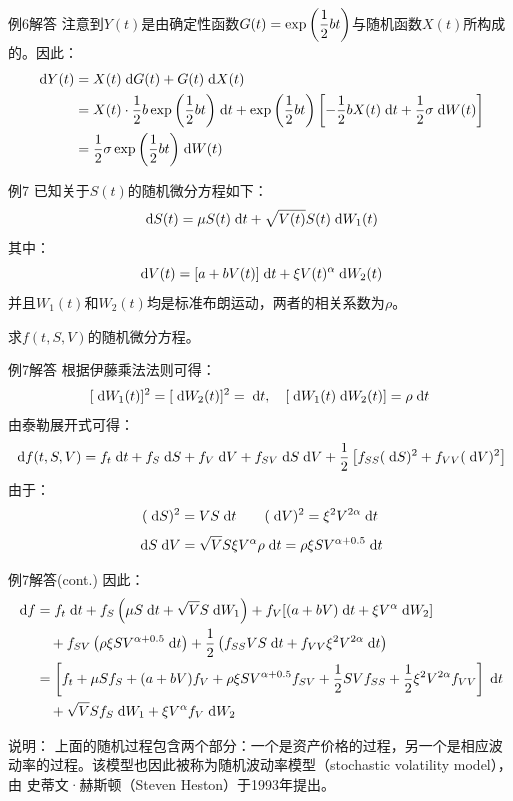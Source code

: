 \documentclass[t]{beamer}
\newcommand{\dif}{{\;\rm d}}
\begin{document}
\begin{frame}{例6解答}
    注意到$Y(t)$是由确定性函数$G(t)=\exp\qty(\displaystyle\frac{1}{2}bt)$与随机函数$X(t)$所构成的。因此：
    \[\begin{split}
    \dif Y(t)&= X(t)\dif G(t)+G(t)\dif X(t)\\
    &=X(t)\cdot \frac{1}{2}b\exp\qty(\displaystyle\frac{1}{2}bt)\dif t+\exp\qty(\displaystyle\frac{1}{2}bt)\left[-\frac{1}{2}bX(t)\dif t+\frac{1}{2}\sigma \dif W(t)\right]\\
    &=\frac{1}{2}\sigma \exp\qty(\displaystyle\frac{1}{2}bt)  \dif W(t)
    \end{split} \]
    
    \end{frame}


\begin{frame}{例7}
已知关于$S(t)$的随机微分方程如下：
\[\dif S(t)=\mu S(t)\dif t +\sqrt{V(t)}S(t)\dif W_1(t) \]
其中：
\[\dif V(t)=[a+b V(t)]\dif t +\xi V(t)^{\alpha}\dif W_2(t) \]
并且$W_1(t)$和$W_2(t)$均是标准布朗运动，两者的相关系数为$\rho$。

求$f(t,S,V)$的随机微分方程。
\end{frame}


    \begin{frame}{例7解答}
        根据伊藤乘法法则可得：$$[\dif W_1(t)]^2=[\dif W_2(t)]^2=\dif t,\quad [\dif W_1(t)\dif W_2(t)]=\rho\dif t$$
        由泰勒展开式可得：
        \[\dif f(t,S,V)=f_t\dif t+f_S\dif S+f_V\dif V+f_{SV}\dif S\dif V+\frac{1}{2}\left[f_{SS}(\dif S)^2+f_{VV}(\dif V)^2\right]\]
        由于：
        \[    (\dif S)^2=VS\dif t\qquad 
        (\dif V)^2=\xi^2 V^{2\alpha}\dif t\]
        \[\dif S\dif V=\sqrt{V}S\xi V^{\alpha}\rho\dif t=\rho\xi SV^{\alpha+0.5}\dif t
    \]
\end{frame}


\begin{frame}{例7解答(cont.)}
        因此：
        \[\begin{split}
        \dif f&=f_t\dif t+f_S\left(\mu S\dif t +\sqrt{V}S\dif W_1\right)+f_V[(a+b V)\dif t +\xi V^{\alpha}\dif W_2]\\
        &\quad +f_{SV}\left(\rho\xi SV^{\alpha+0.5}\dif t\right)+\frac{1}{2}\left(f_{SS}VS\dif t+f_{VV}\xi^2 V^{2\alpha}\dif t\right)\\
        &=\left[f_t+\mu S f_S+(a+bV)f_V+\rho\xi SV^{\alpha+0.5}f_{SV}+\frac{1}{2}SVf_{SS}+\frac{1}{2}\xi^2 V^{2\alpha}f_{VV} \right]\dif t \\
        &\quad +\sqrt{V}Sf_S \dif W_1+\xi V^{\alpha}f_V\dif W_2
        \end{split} \]

        \begin{block}{说明：}
            上面的随机过程包含两个部分：一个是资产价格的过程，另一个是相应波
动率的过程。该模型也因此被称为随机波动率模型（stochastic volatility model），由
史蒂文·赫斯顿（Steven Heston）于1993年提出。
        \end{block}
\end{frame}
\end{document}
